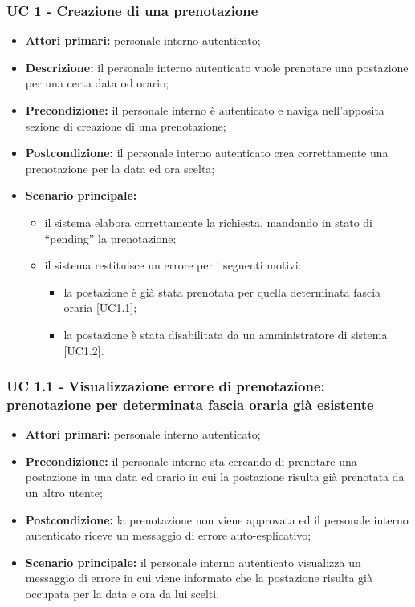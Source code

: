 \subsubsection{UC 1 - Creazione di una prenotazione}

\begin{itemize}
\item \textbf{Attori primari:} personale interno autenticato;
\item \textbf{Descrizione:} il personale interno autenticato vuole prenotare una postazione per una certa data od orario;
\item \textbf{Precondizione:} il personale interno è autenticato e naviga nell’apposita sezione di creazione di una prenotazione;
\item \textbf{Postcondizione:} il personale interno autenticato crea correttamente una prenotazione per la data ed ora scelta;
\item \textbf{Scenario principale:} 
	\begin{itemize}
		\item il sistema elabora correttamente la richiesta, mandando in stato di “pending” la prenotazione;
		\item il sistema restituisce un errore per i seguenti motivi:
		\begin{itemize}
			\item la postazione è già stata prenotata per quella determinata fascia oraria [UC1.1];
			\item la postazione è stata disabilitata da un amministratore di sistema [UC1.2].	
		\end{itemize}
	\end{itemize}
\end{itemize}

\subsubsection{UC 1.1 - Visualizzazione errore di prenotazione: prenotazione per determinata fascia oraria già esistente}
\begin{itemize}
\item \textbf{Attori primari:} personale interno autenticato;
\item \textbf{Precondizione:} il personale interno sta cercando di prenotare una postazione in una data ed orario in cui la postazione risulta già prenotata da un altro utente;
\item \textbf{Postcondizione:} la prenotazione non viene approvata ed il personale interno autenticato riceve un messaggio di errore auto-esplicativo;
\item \textbf{Scenario principale:} il personale interno autenticato visualizza un messaggio di errore in cui viene informato che la postazione risulta già occupata per la data e ora da lui scelti.
\end{itemize}

